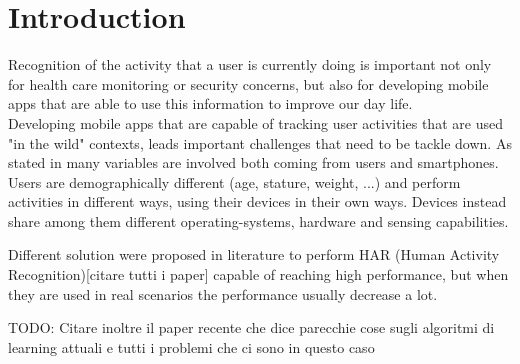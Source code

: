 
\section{Introduction}
\label{sec:introduction}
Recognition of the activity that a user is currently doing is important not only for health care monitoring or security concerns, but also for developing mobile apps that are able to use this information to improve our day life. \\

Developing mobile apps that are capable of tracking user activities that are used "in the wild" contexts, leads important challenges that need to be tackle down. As stated in \cite{blunck2013heterogeneity} many variables are involved both coming from users and smartphones. Users are demographically different (age, stature, weight, ...) and perform activities in different ways, using their devices in their own ways. Devices instead share among them different operating-systems, hardware and sensing capabilities.

Different solution were proposed in literature to perform HAR (Human Activity Recognition)[citare tutti i paper] capable of reaching high performance, but when they are used in real scenarios the performance usually decrease a lot.

TODO: Citare inoltre il paper \cite{chen2020deep} recente che dice parecchie cose sugli algoritmi di learning attuali e tutti i problemi che ci sono in questo caso 




